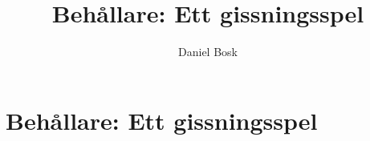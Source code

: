\documentclass[a4paper,10pt,oneside,openright,
               oldfontcommands]{memoir}
\begin{document}
\title{%
  Behållare: Ett gissningsspel
}
\author{Daniel Bosk}

\maketitle

\begin{abstract}
  
\end{abstract}

\clearpage

\tableofcontents*

\chapter{Behållare: Ett gissningsspel}



\appendix


\printbibliography
\end{document}

